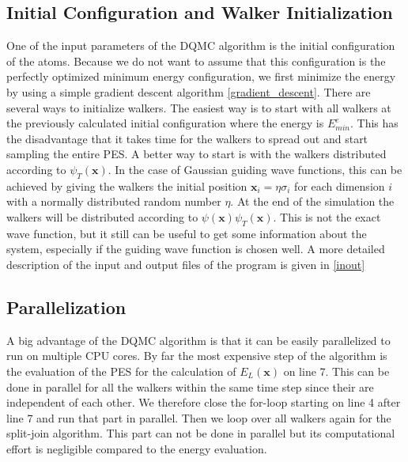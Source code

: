 \documentclass [12pt]{report}
\begin{document}
\subsection{Initial Configuration and Walker Initialization} \label{init}
One of the input parameters of the DQMC algorithm is the initial configuration of the atoms. Because we do not want to assume that this configuration is the perfectly optimized minimum energy configuration, we first minimize the energy by using a simple gradient descent algorithm \ref{gradient_descent}.
There are several ways to initialize walkers. The easiest way is to start with all walkers at the previously calculated initial configuration where the energy is $E^e_{min}$. This has the disadvantage that it takes time for the walkers to spread out and start sampling the entire PES. A better way to start  is with the walkers distributed according to $\psi_T(\bm{x})$. In the case of Gaussian guiding wave functions, this can be achieved by giving the walkers the initial position $\bm{x}_i = \eta \sigma_i$ for each dimension $i$ with a normally distributed random number $\eta$.
At the end of the simulation the walkers will be distributed according to $\psi(\bm{x})\psi_T(\bm{x})$. This is not the exact wave function, but it still can be useful to get some information about the system, especially if the guiding wave function is chosen well. A more detailed description of the input and output files of the program is given in \ref{inout}
\subsection{Parallelization}
A big advantage of the DQMC algorithm is that it can be easily parallelized to run on multiple CPU cores. By far the most expensive step of the algorithm is the evaluation of the PES for the calculation of $E_L(\bm{x})$ on line 7. This can be done in parallel for all the walkers within the same time step since their are independent of each other. We therefore close the for-loop starting on line 4 after line 7 and run that part in parallel. Then we loop over all walkers again for the split-join algorithm. This part can not be done in parallel but its computational effort is negligible compared to the energy evaluation.
\end{document}
